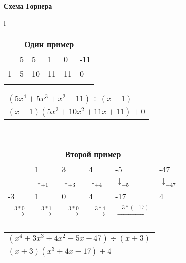 \textbf{Схема Горнера}\\
\begin{tabular}{l}

\begin{tabular}{|l|l|l|l|l|l|}
	\multicolumn{6}{c}{Один пример} \\
	\hline
	&    
	5 &
	5 &
	1 &
	0 &
	-11 
	\\ 
	\hline
	1& 
	5 &
	10 &
	11 &
	11 &
	0\\
	\hline
	\multicolumn{1}{c}{}
\end{tabular}
\begin{tabular}{l}
	$(5x^4 + 5x^3 + x^2 -11) \div (x - 1) $ \\
	$(x - 1)(5x^3 + 10 x^2 + 11 x + 11) + 0$
\end{tabular}
\\
\begin{tabular}{|l|l|l|l|l|l|}
	\multicolumn{6}{c}{Второй пример} \\
	\hline   
	&
	1 &
	3 &
	4 &
	-5 &
	-47 
	\\
	
	
	\hline
	&
	$\downarrow_{+1}$ &
	$\downarrow_{+3}$ &
	$\downarrow_{+4}$ &
	$\downarrow_{-5}$ &
	$\downarrow_{-47}$\\
	 
	\hline
	-3& 
	1 &
	0 &
	4 &
	-17 &
	4\\
	
	\hline
	
	
	
	$\xrightarrow[]{-3 * 0}$ &
	$\xrightarrow[]{-3 * 1}$  &
	$\xrightarrow[]{-3 * 0}$  &
	$\xrightarrow[]{-3 * 4}$  &
	$\xrightarrow[]{-3 * (-17)}$
	&
	\\ 
	\hline
	
\end{tabular}
\begin{tabular}{l}
	$(x^4 + 3x^3 + 4x^2 - 5x -47) \div (x + 3) $ \\
	$(x + 3)(x^3 + 4x -17) + 4$
\end{tabular}

\end{tabular}\\


